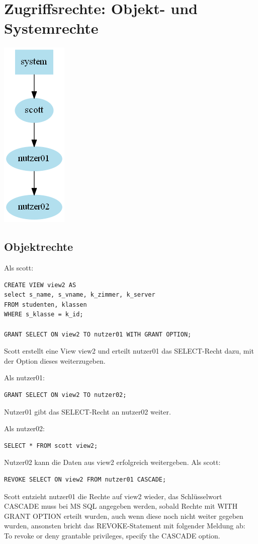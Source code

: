 \documentclass[10pt]{scrreprt}
\begin{document}
\section{Zugriffsrechte: Objekt- und Systemrechte}
\begin{center}
\includegraphics[scale=0.5]{Oracle_Dependency.png}
\end{center}
\subsection{Objektrechte}
Als scott:
\begin{lstlisting}[style=sql]
CREATE VIEW view2 AS
select s_name, s_vname, k_zimmer, k_server
FROM studenten, klassen
WHERE s_klasse = k_id;

GRANT SELECT ON view2 TO nutzer01 WITH GRANT OPTION;
\end{lstlisting}
Scott erstellt eine View view2 und erteilt nutzer01 das SELECT-Recht dazu, mit der Option dieses weiterzugeben.

Als nutzer01:
\begin{lstlisting}[style=sql]
GRANT SELECT ON view2 TO nutzer02;
\end{lstlisting}
Nutzer01 gibt das SELECT-Recht an nutzer02 weiter.

Als nutzer02:
\begin{lstlisting}[style=sql]
SELECT * FROM scott view2;
\end{lstlisting}
Nutzer02 kann die Daten aus view2 erfolgreich weitergeben.
\newpage
Als scott:
\begin{lstlisting}[style=sql]
REVOKE SELECT ON view2 FROM nutzer01 CASCADE;
\end{lstlisting}
Scott entzieht nutzer01 die Rechte auf view2 wieder, das Schlüsselwort CASCADE muss bei MS SQL angegeben werden, sobald Rechte mit WITH GRANT OPTION erteilt wurden, auch wenn diese noch nicht weiter gegeben wurden, ansonsten bricht das REVOKE-Statement mit folgender Meldung ab:\\
To revoke or deny grantable privileges, specify the CASCADE option.
\end{document}
